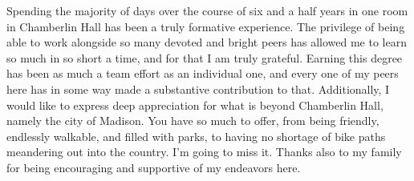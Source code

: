 



Spending the majority of days over the course of six and a half years in one room in Chamberlin Hall has been a truly formative experience. The privilege of being able to work alongside so many devoted and bright peers has allowed me to learn so much in so short a time, and for that I am truly grateful. Earning this degree has been as much a team effort as an individual one, and every one of my peers here has in some way made a substantive contribution to that. Additionally, I would like to express deep appreciation for what is beyond Chamberlin Hall, namely the city of Madison. You have so much to offer, from being friendly, endlessly walkable, and filled with parks, to having no shortage of bike paths meandering out into the country. I'm going to miss it. Thanks also to my family for being encouraging and supportive of my endeavors here.

